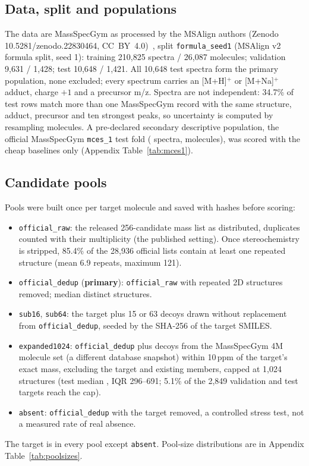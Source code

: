 \documentclass[11pt]{article}
\newcommand{\m}[1]{\texttt{#1}}
\begin{document}
\subsection{Data, split and populations}\label{sec:data}
The data are MassSpecGym as processed by the MSAlign authors (Zenodo 10.5281/zenodo.22830464,
CC~BY~4.0)~\citep{krzakala2026zenodo,bushuiev2024massspecgym}, split \m{formula\_seed1} (MSAlign v2 formula split, seed
1): training 210,825 spectra / 26,087 molecules; validation 9,631 / 1,428; test 10,648 / 1,421. All 10,648 test spectra
form the primary population, none excluded; every spectrum carries an [M+H]$^+$ or [M+Na]$^+$ adduct, charge $+1$ and a
precursor m/z. Spectra are not independent: 34.7\% of test rows match more than one MassSpecGym record with the same
structure, adduct, precursor and ten strongest peaks, so uncertainty is computed by resampling molecules. A
pre-declared secondary descriptive population, the official MassSpecGym \m{mces\_1} test fold (\MCESSpectra{}
spectra, \MCESMolecules{} molecules), was scored with the cheap baselines only (Appendix Table~\ref{tab:mces1}).

\subsection{Candidate pools}\label{sec:pools}
Pools were built once per target molecule and saved with hashes before scoring:
\begin{itemize}
\item \m{official\_raw}: the released 256-candidate mass list as distributed, duplicates counted with their
multiplicity (the published setting). Once stereochemistry is stripped, 85.4\% of the 28,936 official lists contain
at least one repeated structure (mean 6.9 repeats, maximum 121).
\item \m{official\_dedup} (\textbf{primary}): \m{official\_raw} with repeated 2D structures removed; median
\DedupMedian{} distinct structures.
\item \m{sub16}, \m{sub64}: the target plus 15 or 63 decoys drawn without replacement from \m{official\_dedup}, seeded
by the SHA-256 of the target SMILES.
\item \m{expanded1024}: \m{official\_dedup} plus decoys from the MassSpecGym 4M molecule set (a different database
snapshot) within 10\,ppm of the target's exact mass, excluding the target and existing members, capped at 1,024
structures (test median \ExpandedMedian, IQR 296--691; 5.1\% of the 2,849 validation and test targets reach the cap).
\item \m{absent}: \m{official\_dedup} with the target removed, a controlled stress test, not a measured rate of real
absence.
\end{itemize}
The target is in every pool except \m{absent}. Pool-size distributions are in Appendix Table~\ref{tab:poolsizes}.
\end{document}

